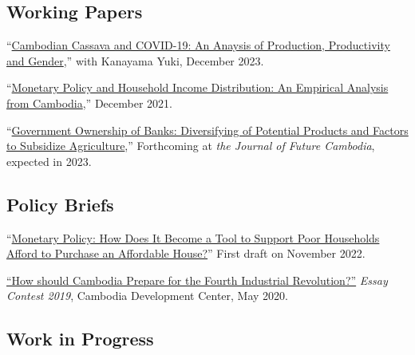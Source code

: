 \documentclass[10pt,a4paper]{article}
\begin{document}
\subsection*{Working Papers}

		“\href{}{Cambodian Cassava and COVID-19: An Anaysis of Production, Productivity and Gender},” with Kanayama Yuki, December 2023.\\ \vspace{-.5em}
		
		“\href{https://kosalnith.github.io/research/papers/MPHI.pdf}{Monetary Policy and Household Income Distribution: An Empirical Analysis from Cambodia},” December 2021.\\ \vspace{-.5em}
	
		“\href{https://kosalnith.github.io/research/papers/GOB.pdf}{Government Ownership of Banks: Diversifying of Potential Products and Factors to Subsidize Agriculture},” Forthcoming at \textit{the Journal of Future Cambodia}, expected in 2023.

\subsection*{Policy Briefs}
	“\href{}{Monetary Policy: How Does It Become a Tool to Support Poor Households Afford to Purchase an Affordable House?}” First draft on November 2022. \\ \vspace{-.5em}
	
		\href{https://cd-center.org/en/essay-contest-2019-first-place-winner/}{``How should Cambodia Prepare for the Fourth Industrial Revolution?''} \textit{Essay Contest 2019}, Cambodia Development Center, May 2020.

\subsection*{Work in Progress}
	
\end{document}
